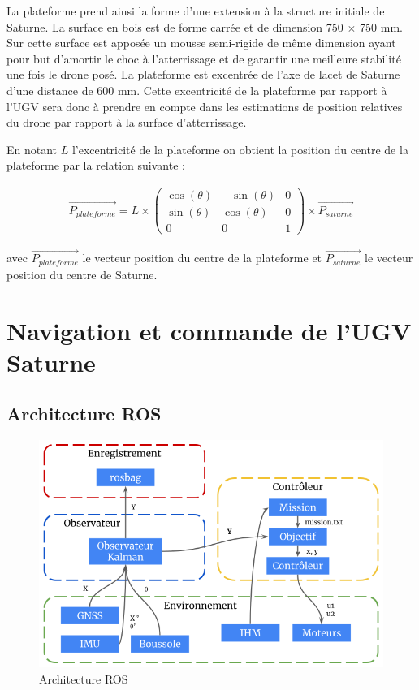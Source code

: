 La plateforme prend ainsi la forme d’une extension à la structure initiale de Saturne. La surface en bois est de forme carrée et de dimension 750 $\times$ 750 mm. Sur cette surface est apposée un mousse semi-rigide de même dimension ayant pour but d’amortir le choc à l’atterrissage et de garantir une meilleure stabilité une fois le drone posé. La plateforme est excentrée de l’axe de lacet de Saturne d’une distance de 600 mm. Cette excentricité de la plateforme par rapport à l’UGV sera donc à prendre en compte dans les estimations de position relatives du drone par rapport à la surface d'atterrissage.

En notant $L$ l’excentricité de la plateforme on obtient la position du centre de la plateforme par la relation suivante :

\begin{align}
    \overrightarrow{P_{plateforme}} = L \times \begin{pmatrix}
    \cos(\theta) & -\sin(\theta) & 0 \\
    \sin(\theta) & \cos(\theta) & 0 \\
    0 & 0 & 1
    \end{pmatrix}
    \times \overrightarrow{P_{saturne}}
\end{align}

avec $\overrightarrow{P_{plateforme}}$ le vecteur position du centre de la plateforme et $\overrightarrow{P_{saturne}}$ le vecteur position du centre de Saturne.

\section{Navigation et commande de l’UGV Saturne}

\subsection{Architecture ROS}

\begin{figure}[H]
    \centering\includegraphics[width=150mm]{images/ugv/arch_ros.png}
    \caption{Architecture ROS}
\end{figure}

